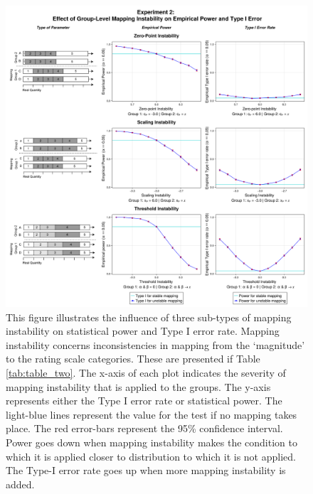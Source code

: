 \documentclass[titlepage, a4paper, 11pt]{article}
\begin{document}
\begin{figure}
    \centering
    \includegraphics[width=0.9\linewidth]{Plots/measurement_instability_group_based.png}
    \caption{This figure illustrates the influence of three sub-types of mapping instability on statistical power and Type I error rate. Mapping instability concerns inconsistencies in mapping from the `magnitude' to the rating scale categories. These are presented if Table \ref{tab:table_two}. The x-axis of each plot indicates the severity of mapping instability that is applied to the groups. The y-axis represents either the Type I error rate or statistical power. The light-blue lines represent the value for the test if no mapping takes place. The red error-bars represent the 95\% confidence interval. Power goes down when mapping instability makes the condition to which it is applied closer to distribution to which it is not applied. The Type-I error rate goes up when more mapping instability is added.}
    \label{fig:plot_four}
\end{figure}
\end{document}
